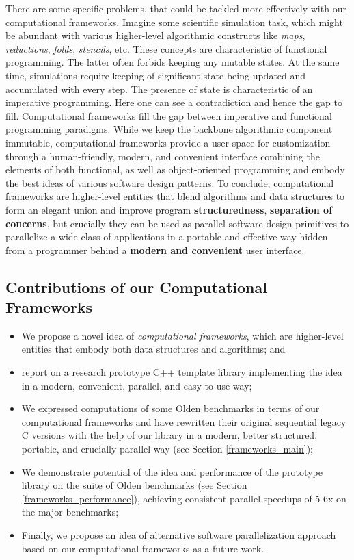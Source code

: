 \quad There are some specific problems, that could be tackled more effectively with our computational frameworks. Imagine some scientific simulation task, which might be abundant with various higher-level algorithmic constructs like \textit{maps}, \textit{reductions}, \textit{folds}, \textit{stencils}, etc. These concepts are characteristic of functional programming. The latter often forbids keeping any mutable states. At the same time, simulations require keeping of significant state being updated and accumulated with every step. The presence of state is characteristic of an imperative programming. Here one can see a contradiction and hence the gap to fill. Computational frameworks fill the gap between imperative and functional programming paradigms. While we keep the backbone algorithmic component immutable, computational frameworks provide a user-space for customization through a human-friendly, modern, and convenient interface combining the elements of both functional, as well as object-oriented programming and embody the best ideas of various software design patterns.\newline\null
\quad To conclude, computational frameworks are higher-level entities that blend algorithms and data structures to form an elegant union and improve program \textbf{structuredness}, \textbf{separation of concerns}, but crucially they can be used as parallel software design primitives to parallelize a wide class of applications in a portable and effective way hidden from a programmer behind a \textbf{modern and convenient} user interface.
\subsection{Contributions of our Computational Frameworks}
\begin{itemize}[style=unboxed,leftmargin=0cm]
\itemsep0em
\renewcommand\labelitemi{$\vartriangleright$}
\renewcommand\labelitemii{$\bullet$}
\item We propose a novel idea of \textit{computational frameworks}, which are higher-level entities that embody both data structures and algorithms; and
\item report on a research prototype C++ template library \cite{frameworks-repo} implementing the idea in a modern, convenient, parallel, and easy to use way;
\item We expressed computations of some Olden benchmarks in terms of our computational frameworks and have rewritten their original sequential legacy C versions with the help of our library in a modern, better structured, portable, and crucially parallel way (see Section \ref{frameworks_main});
\item We demonstrate potential of the idea and performance of the prototype library on the suite of Olden benchmarks (see Section \ref{frameworks_performance}), achieving consistent parallel speedups of 5-6x on the major benchmarks;
\item Finally, we propose an idea of alternative software parallelization approach based on our computational frameworks as a future work.
\end{itemize}

%